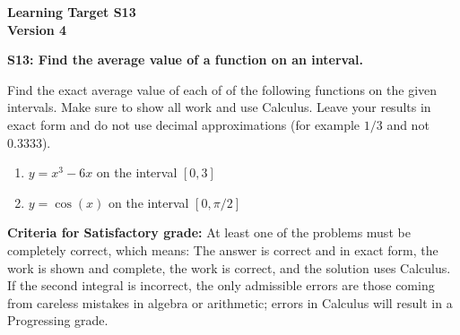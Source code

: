 \documentclass[10pt]{article}
\begin{document}
	\vspace*{0in}

		\begin{center}
			\textbf{Learning Target S13 \\
			Version 4} 
		\end{center}


\begin{framed}
	\textbf{S13: Find the average value of a function on an interval.}
\end{framed}

Find the exact average value of each of of the following functions on the given intervals. Make sure to show all work and use Calculus. Leave your results in exact form and do not use decimal approximations (for example $1/3$ and not $0.3333$). 

\begin{enumerate}
    \item $y = x^3 - 6x$ on the interval $[0,3]$
    \item $y = \cos(x)$ on the interval $[0, \pi/2]$
\end{enumerate}

\vfill


\begin{small}
    \begin{framed}
        	\textbf{Criteria for Satisfactory grade:} At least one of the problems must be completely correct, which means: The answer is correct and in exact form, the work is shown and complete, the work is correct, and the solution uses Calculus. If the second  integral is incorrect, the only admissible errors are those coming from careless mistakes in algebra or arithmetic; errors in Calculus will result in a Progressing grade. 
    \end{framed}

\end{small}
\end{document}
